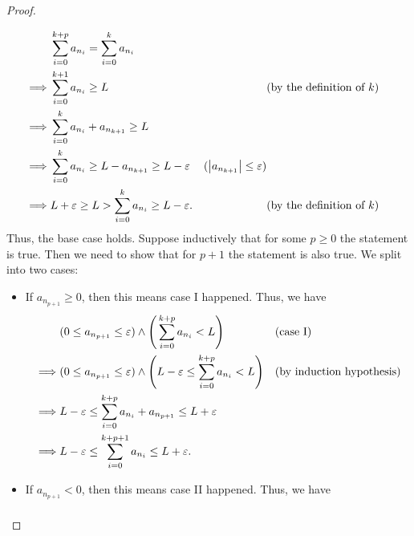 \begin{proof}
\begin{itemize}
\begin{align*}
                     & \sum_{i = 0}^{k + p} a_{n_i} = \sum_{i = 0}^k a_{n_i}                                                                                                \\
            \implies & \sum_{i = 0}^{k + 1} a_{n_i} \geq L                                   &                                        & \text{(by the definition of \(k\))} \\
            \implies & \sum_{i = 0}^k a_{n_i} + a_{n_{k + 1}} \geq L                                                                                                        \\
            \implies & \sum_{i = 0}^k a_{n_i} \geq L - a_{n_{k + 1}} \geq L - \varepsilon    & (\left\lvert a_{n_{k + 1}}\right\rvert \leq \varepsilon)                                       \\
            \implies & L + \varepsilon \geq L > \sum_{i = 0}^k a_{n_i} \geq L - \varepsilon. &                                        & \text{(by the definition of \(k\))}
          \end{align*}
          Thus, the base case holds.
          Suppose inductively that for some \(p \geq 0\) the statement is true.
          Then we need to show that for \(p + 1\) the statement is also true.
          We split into two cases:
          \begin{itemize}
            \item If \(a_{n_{p + 1}} \geq 0\), then this means case I happened.
                  Thus, we have
                  \begin{align*}
                             & (0 \leq a_{n_{p + 1}} \leq \varepsilon) \land \Bigg(\sum_{i = 0}^{k + p} a_{n_i} < L\Bigg)                      &  & \text{(case I)} \\
                    \implies & (0 \leq a_{n_{p + 1}} \leq \varepsilon) \land \Bigg(L - \varepsilon \leq \sum_{i = 0}^{k + p} a_{n_i} < L\Bigg) &  & \text{(by induction hypothesis)}           \\
                    \implies & L - \varepsilon \leq \sum_{i = 0}^{k + p} a_{n_i} + a_{n_{p + 1}} \leq L + \varepsilon                                               \\
                    \implies & L - \varepsilon \leq \sum_{i = 0}^{k + p + 1} a_{n_i} \leq L + \varepsilon.
                  \end{align*}
            \item If \(a_{n_{p + 1}} < 0\), then this means case II happened.
                  Thus, we have
                  \begin{align*}

\end{align*}
\end{itemize}
\end{itemize}
\end{proof}
